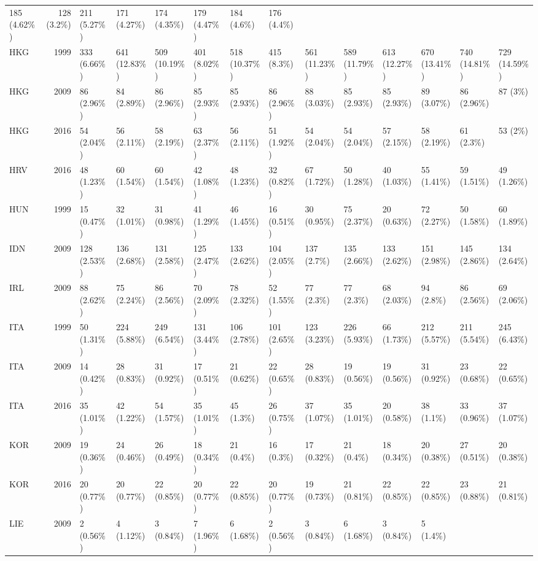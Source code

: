 \documentclass[]{article}
\begin{document}
\begin{longtable}[]{@{}lrllllllllllll@{}}
185 (4.62\%) & 128 (3.2\%) & 211 (5.27\%) & 171 (4.27\%) & 174 (4.35\%)
& 179 (4.47\%) & 184 (4.6\%) & 176 (4.4\%)\tabularnewline
HKG & 1999 & 333 (6.66\%) & 641 (12.83\%) & 509 (10.19\%) & 401 (8.02\%)
& 518 (10.37\%) & 415 (8.3\%) & 561 (11.23\%) & 589 (11.79\%) & 613
(12.27\%) & 670 (13.41\%) & 740 (14.81\%) & 729 (14.59\%)\tabularnewline
HKG & 2009 & 86 (2.96\%) & 84 (2.89\%) & 86 (2.96\%) & 85 (2.93\%) & 85
(2.93\%) & 86 (2.96\%) & 88 (3.03\%) & 85 (2.93\%) & 85 (2.93\%) & 89
(3.07\%) & 86 (2.96\%) & 87 (3\%)\tabularnewline
HKG & 2016 & 54 (2.04\%) & 56 (2.11\%) & 58 (2.19\%) & 63 (2.37\%) & 56
(2.11\%) & 51 (1.92\%) & 54 (2.04\%) & 54 (2.04\%) & 57 (2.15\%) & 58
(2.19\%) & 61 (2.3\%) & 53 (2\%)\tabularnewline
HRV & 2016 & 48 (1.23\%) & 60 (1.54\%) & 60 (1.54\%) & 42 (1.08\%) & 48
(1.23\%) & 32 (0.82\%) & 67 (1.72\%) & 50 (1.28\%) & 40 (1.03\%) & 55
(1.41\%) & 59 (1.51\%) & 49 (1.26\%)\tabularnewline
HUN & 1999 & 15 (0.47\%) & 32 (1.01\%) & 31 (0.98\%) & 41 (1.29\%) & 46
(1.45\%) & 16 (0.51\%) & 30 (0.95\%) & 75 (2.37\%) & 20 (0.63\%) & 72
(2.27\%) & 50 (1.58\%) & 60 (1.89\%)\tabularnewline
IDN & 2009 & 128 (2.53\%) & 136 (2.68\%) & 131 (2.58\%) & 125 (2.47\%) &
133 (2.62\%) & 104 (2.05\%) & 137 (2.7\%) & 135 (2.66\%) & 133 (2.62\%)
& 151 (2.98\%) & 145 (2.86\%) & 134 (2.64\%)\tabularnewline
IRL & 2009 & 88 (2.62\%) & 75 (2.24\%) & 86 (2.56\%) & 70 (2.09\%) & 78
(2.32\%) & 52 (1.55\%) & 77 (2.3\%) & 77 (2.3\%) & 68 (2.03\%) & 94
(2.8\%) & 86 (2.56\%) & 69 (2.06\%)\tabularnewline
ITA & 1999 & 50 (1.31\%) & 224 (5.88\%) & 249 (6.54\%) & 131 (3.44\%) &
106 (2.78\%) & 101 (2.65\%) & 123 (3.23\%) & 226 (5.93\%) & 66 (1.73\%)
& 212 (5.57\%) & 211 (5.54\%) & 245 (6.43\%)\tabularnewline
ITA & 2009 & 14 (0.42\%) & 28 (0.83\%) & 31 (0.92\%) & 17 (0.51\%) & 21
(0.62\%) & 22 (0.65\%) & 28 (0.83\%) & 19 (0.56\%) & 19 (0.56\%) & 31
(0.92\%) & 23 (0.68\%) & 22 (0.65\%)\tabularnewline
ITA & 2016 & 35 (1.01\%) & 42 (1.22\%) & 54 (1.57\%) & 35 (1.01\%) & 45
(1.3\%) & 26 (0.75\%) & 37 (1.07\%) & 35 (1.01\%) & 20 (0.58\%) & 38
(1.1\%) & 33 (0.96\%) & 37 (1.07\%)\tabularnewline
KOR & 2009 & 19 (0.36\%) & 24 (0.46\%) & 26 (0.49\%) & 18 (0.34\%) & 21
(0.4\%) & 16 (0.3\%) & 17 (0.32\%) & 21 (0.4\%) & 18 (0.34\%) & 20
(0.38\%) & 27 (0.51\%) & 20 (0.38\%)\tabularnewline
KOR & 2016 & 20 (0.77\%) & 20 (0.77\%) & 22 (0.85\%) & 20 (0.77\%) & 22
(0.85\%) & 20 (0.77\%) & 19 (0.73\%) & 21 (0.81\%) & 22 (0.85\%) & 22
(0.85\%) & 23 (0.88\%) & 21 (0.81\%)\tabularnewline
LIE & 2009 & 2 (0.56\%) & 4 (1.12\%) & 3 (0.84\%) & 7 (1.96\%) & 6
(1.68\%) & 2 (0.56\%) & 3 (0.84\%) & 6 (1.68\%) & 3 (0.84\%) & 5 (1.4\%)

\end{longtable}
\end{document}
